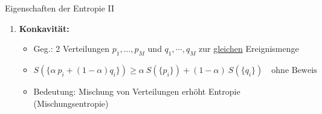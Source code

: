 \begin{prop}{Eigenschaften der Entropie II}
\begin{enumerate}
    \begin{equation}
        S(\{p_i\}) \leq -k \ \sum_{i=1}^M \ p_i \ ln(q_i) \quad (\text{unanschaulich})
    \end{equation}
    \begin{itemize}
        \item[] (mit Gleichheit nur falls $\forall i: \ q_i = p_i$)
        \item[] \underline{Anwendung:} Beweise, dass jede bel. Verteilung $\{p_i\}$ eine kleinere Entropie hat als die Gleichverteilung $\{q_i=\frac{1}{M}\}$ mit Entropie $S = k \ ln(M)$
        \begin{equation}
        S(\{p_i\}) \stackrel{s.o.}{\leq} -k \sum_{i=1}^M p_i \ ln(\underbrace{q_i}_{\frac{1}{M}}) \stackrel{p_i \text{ normiert}}{=} k \ ln(M)
        \end{equation}
    \end{itemize}
    \item \textbf{Konkavität:}
    \begin{itemize}
        \item[] Geg.: 2 Verteilungen $p_1,\dots, p_M$ und $q_1,\cdots,q_M$ zur \underline{gleichen} Ereignismenge
        \item[] 
        \begin{equation}
            S(\{\alpha \ p_i + (1-\alpha) q_i\}) \geq \alpha \ S(\{p_i\}) + (1-\alpha) \ S(\{q_i\}) \quad \text{ohne Beweis}
        \end{equation}
        \begin{center}
        \end{center}
        \item[] Bedeutung: Mischung von Verteilungen erhöht Entropie (Mischungsentropie) 
    \end{itemize}
\end{enumerate}
\end{prop}



